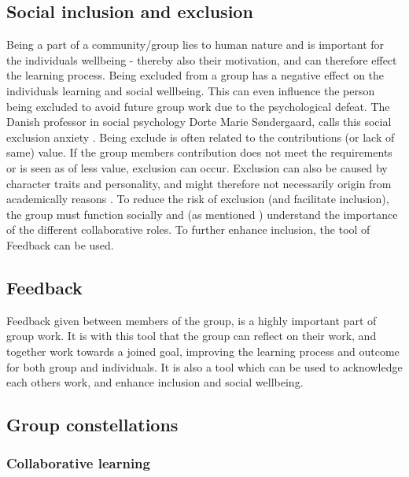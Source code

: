 \subsection{Social inclusion and exclusion}
Being a part of a community/group lies to human nature and is important for the individuals wellbeing  \cite{ProjektarbejdesKompleksitet}- thereby also their motivation, and can therefore effect the learning process. Being excluded from a group has a negative effect on the individuals learning and social wellbeing. This can even influence the person being excluded to avoid future group work due to the psychological defeat.   The Danish professor in social psychology Dorte Marie Søndergaard, calls this  social exclusion anxiety \cite{ProjektarbejdesKompleksitet}. Being exclude is often related to the contributions (or lack of same) value. If the group members contribution does not meet the requirements or is seen as of less value, exclusion can occur. Exclusion can also be caused by character traits and personality, and might therefore not necessarily origin from academically reasons \cite{ProjektarbejdesKompleksitet}.
To reduce the risk of exclusion (and facilitate inclusion), the group must function socially and (as mentioned ) understand the importance of the different collaborative roles. To further enhance inclusion, the tool of Feedback can be used. 

\subsection{Feedback}
Feedback given between members of the group, is a highly important part of group work. It is with this tool that the group can reflect on their work, and together work towards a joined goal, improving the learning process and outcome for both group and individuals\cite{ProjektarbejdesKompleksitet}. It is also a tool which can be used to acknowledge each others work, and enhance inclusion and social wellbeing. 


\subsection{Group constellations}

\subsubsection{Collaborative learning}

